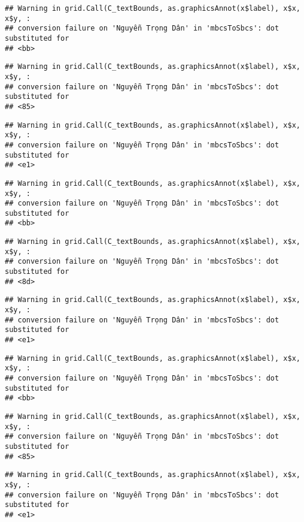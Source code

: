 \documentclass[
]{article}
\begin{document}
\begin{verbatim}
## Warning in grid.Call(C_textBounds, as.graphicsAnnot(x$label), x$x, x$y, :
## conversion failure on 'Nguyễn Trọng Dân' in 'mbcsToSbcs': dot substituted for
## <bb>
\end{verbatim}

\begin{verbatim}
## Warning in grid.Call(C_textBounds, as.graphicsAnnot(x$label), x$x, x$y, :
## conversion failure on 'Nguyễn Trọng Dân' in 'mbcsToSbcs': dot substituted for
## <85>
\end{verbatim}

\begin{verbatim}
## Warning in grid.Call(C_textBounds, as.graphicsAnnot(x$label), x$x, x$y, :
## conversion failure on 'Nguyễn Trọng Dân' in 'mbcsToSbcs': dot substituted for
## <e1>
\end{verbatim}

\begin{verbatim}
## Warning in grid.Call(C_textBounds, as.graphicsAnnot(x$label), x$x, x$y, :
## conversion failure on 'Nguyễn Trọng Dân' in 'mbcsToSbcs': dot substituted for
## <bb>
\end{verbatim}

\begin{verbatim}
## Warning in grid.Call(C_textBounds, as.graphicsAnnot(x$label), x$x, x$y, :
## conversion failure on 'Nguyễn Trọng Dân' in 'mbcsToSbcs': dot substituted for
## <8d>
\end{verbatim}

\begin{verbatim}
## Warning in grid.Call(C_textBounds, as.graphicsAnnot(x$label), x$x, x$y, :
## conversion failure on 'Nguyễn Trọng Dân' in 'mbcsToSbcs': dot substituted for
## <e1>
\end{verbatim}

\begin{verbatim}
## Warning in grid.Call(C_textBounds, as.graphicsAnnot(x$label), x$x, x$y, :
## conversion failure on 'Nguyễn Trọng Dân' in 'mbcsToSbcs': dot substituted for
## <bb>
\end{verbatim}

\begin{verbatim}
## Warning in grid.Call(C_textBounds, as.graphicsAnnot(x$label), x$x, x$y, :
## conversion failure on 'Nguyễn Trọng Dân' in 'mbcsToSbcs': dot substituted for
## <85>
\end{verbatim}

\begin{verbatim}
## Warning in grid.Call(C_textBounds, as.graphicsAnnot(x$label), x$x, x$y, :
## conversion failure on 'Nguyễn Trọng Dân' in 'mbcsToSbcs': dot substituted for
## <e1>
\end{verbatim}
\end{document}
